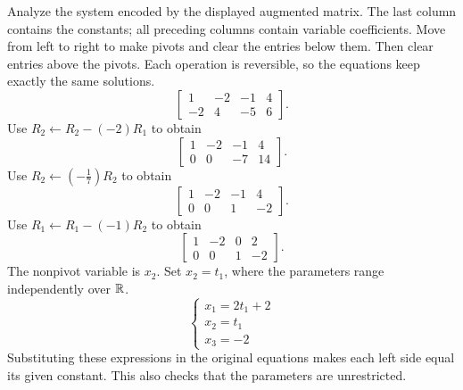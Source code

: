 \goal Analyze the system encoded by the displayed augmented matrix. The last column contains the constants; all preceding columns contain variable coefficients.
\idea Move from left to right to make pivots and clear the entries below them. Then clear entries above the pivots. Each operation is reversible, so the equations keep exactly the same solutions.
\[ \left[\begin{array}{rrr|r}1&-2&-1&4\\-2&4&-5&6\end{array}\right].\]
Use $R_{2}\leftarrow R_{2}-(-2)R_{1}$ to obtain
\[ \left[\begin{array}{rrr|r}1&-2&-1&4\\0&0&-7&14\end{array}\right].\]
Use $R_{2}\leftarrow(- \frac{1}{7})R_{2}$ to obtain
\[ \left[\begin{array}{rrr|r}1&-2&-1&4\\0&0&1&-2\end{array}\right].\]
Use $R_{1}\leftarrow R_{1}-(-1)R_{2}$ to obtain
\[ \left[\begin{array}{rrr|r}1&-2&0&2\\0&0&1&-2\end{array}\right].\]
The nonpivot variable is $x_{2}$. Set $x_{2}=t_{1}$, where the parameters range independently over $\mathbb{R}$.
\[ \begin{cases}x_{1}=2 t_{1} + 2\\x_{2}=t_{1}\\x_{3}=-2\end{cases}\]
Substituting these expressions in the original equations makes each left side equal its given constant. This also checks that the parameters are unrestricted.


